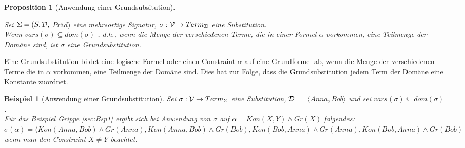 \documentclass[a4paper, 11pt]{book}
\newtheorem{Pro}{Proposition}[section]
\newtheorem{Bsp}{Beispiel}[section]
\begin{document}
\begin{Pro}[Anwendung einer Grundsubsitution] \cite[Kap. 6.2, S. 131, Proposition 6.2.11]{Fis10}\label{Grundsubstitution}
	
\noindent
Sei $ \Sigma = (S, {\cal D},$  $ Präd) $ eine mehrsortige Signatur, $ \sigma: {\cal V} \rightarrow Term_{\Sigma}$ eine Substitution.\\
Wenn $ vars(\sigma) \subseteq dom(\sigma) $ , d.h., wenn die Menge der verschiedenen Terme, die in einer Formel $ \alpha $ vorkommen, eine Teilmenge der Domäne sind, ist $ \sigma $ eine Grundsubstitution. 
\end{Pro}
Eine Grundsubstitution bildet eine logische Formel oder einen Constraint $ \alpha $ auf eine Grundformel ab, wenn die Menge der verschiedenen Terme die in $ \alpha $ vorkommen, eine Teilmenge der Domäne sind. Dies hat zur Folge, dass die Grundsubstitution jedem Term der Domäne eine Konstante zuordnet.

\begin{Bsp}[Anwendung einer Grundsubstitution]
	Sei $ \sigma: {\cal V} \rightarrow Term_{\Sigma}$ eine Substitution, $ \cal D $ $ =  \langle Anna, Bob \rangle $ und sei $ vars(\sigma) \subseteq dom(\sigma) $. \\
	Für das Beispiel Grippe \ref{sec:Bsp1} ergibt sich bei Anwendung von $ \sigma $ auf $ \alpha = Kon(X, Y) \wedge Gr(X ) $ folgendes:\\
	$ \sigma(\alpha) = \langle  Kon(Anna, Bob) \wedge Gr(Anna),  Kon(Anna, Bob) \wedge Gr(Bob),  Kon(Bob, Anna) \wedge Gr(Anna),  Kon(Bob, Anna) \wedge Gr(Bob )  $ wenn man den Constraint  $ X \neq Y $ beachtet.
\end{Bsp}
\end{document}
